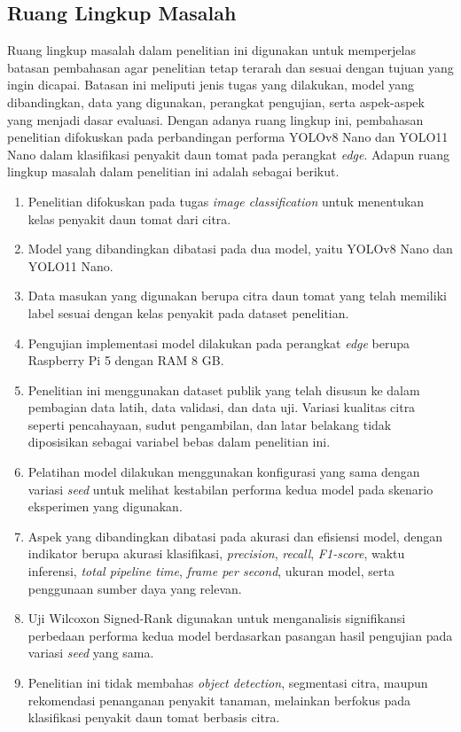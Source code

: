 \begin{sectioncontent}
    \subsection{Ruang Lingkup Masalah}
    \begin{subsectioncontent}
        \hspace{\parindent}Ruang lingkup masalah dalam penelitian ini digunakan untuk memperjelas batasan pembahasan agar penelitian tetap terarah dan sesuai dengan tujuan yang ingin dicapai. Batasan ini meliputi jenis tugas yang dilakukan, model yang dibandingkan, data yang digunakan, perangkat pengujian, serta aspek-aspek yang menjadi dasar evaluasi. Dengan adanya ruang lingkup ini, pembahasan penelitian difokuskan pada perbandingan performa YOLOv8 Nano dan YOLO11 Nano dalam klasifikasi penyakit daun tomat pada perangkat \textit{edge}. Adapun ruang lingkup masalah dalam penelitian ini adalah sebagai berikut.

        \begin{enumerate}[leftmargin=0.75cm,label=\arabic*.]
            \item Penelitian difokuskan pada tugas \textit{image classification} untuk menentukan kelas penyakit daun tomat dari citra.
            \item Model yang dibandingkan dibatasi pada dua model, yaitu YOLOv8 Nano dan YOLO11 Nano.
            \item Data masukan yang digunakan berupa citra daun tomat yang telah memiliki label sesuai dengan kelas penyakit pada dataset penelitian.
            \item Pengujian implementasi model dilakukan pada perangkat \textit{edge} berupa Raspberry Pi 5 dengan RAM 8 GB.
            \item Penelitian ini menggunakan dataset publik yang telah disusun ke dalam pembagian data latih, data validasi, dan data uji. Variasi kualitas citra seperti pencahayaan, sudut pengambilan, dan latar belakang tidak diposisikan sebagai variabel bebas dalam penelitian ini.
            \item Pelatihan model dilakukan menggunakan konfigurasi yang sama dengan variasi \textit{seed} untuk melihat kestabilan performa kedua model pada skenario eksperimen yang digunakan.
            \item Aspek yang dibandingkan dibatasi pada akurasi dan efisiensi model, dengan indikator berupa akurasi klasifikasi, \textit{precision}, \textit{recall}, \textit{F1-score}, waktu inferensi, \textit{total pipeline time}, \textit{frame per second}, ukuran model, serta penggunaan sumber daya yang relevan.
            \item Uji Wilcoxon Signed-Rank digunakan untuk menganalisis signifikansi perbedaan performa kedua model berdasarkan pasangan hasil pengujian pada variasi \textit{seed} yang sama.
            \item Penelitian ini tidak membahas \textit{object detection}, segmentasi citra, maupun rekomendasi penanganan penyakit tanaman, melainkan berfokus pada klasifikasi penyakit daun tomat berbasis citra.
        \end{enumerate}
    \end{subsectioncontent}


\end{sectioncontent}
